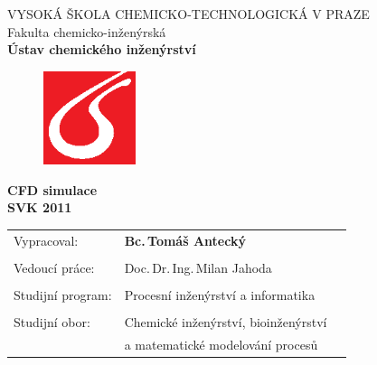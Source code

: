 \begin{center}
{\Large VYSOKÁ ŠKOLA CHEMICKO-TECHNOLOGICKÁ V PRAZE\\}
{\large Fakulta chemicko-inženýrská\\
\textbf{Ústav chemického inženýrství}\\}
\vspace{15mm}

\begin{figure}[!h]
\begin{center}
\includegraphics[angle=0,width=27mm]{images/logo_vscht.eps}
\end{center}
\end{figure}

\vspace{25mm}

{\huge \textbf{CFD simulace\\}}
\vspace{10mm}
{\Large \textbf{SVK 2011\\}}
\end{center}
\vspace{35mm}


\begin{tabular}{p{50mm}lp{50mm}}
Vypracoval: & \textbf{Bc.\,Tomáš Antecký}\\
\\
Vedoucí práce: & Doc.\,Dr.\,Ing.\,Milan Jahoda \\

\\
Studijní program: & Procesní inženýrství a informatika \\
\\
Studijní obor: & Chemické inženýrství, bioinženýrství \\
	& a matematické modelování procesů\\
\end{tabular}
